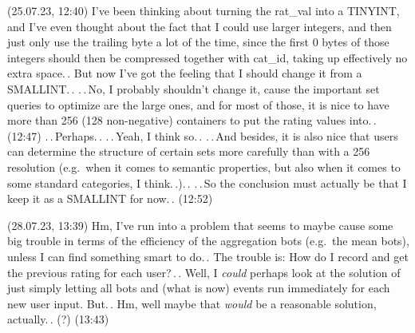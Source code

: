 \documentclass{report}
\begin{document}
(25.07.23, 12:40) I've been thinking about turning the rat\_val into a TINYINT, and I've even thought about the fact that I could use larger integers, and then just only use the trailing byte a lot of the time, since the first 0 bytes of those integers should then be compressed together with cat\_id, taking up effectively no extra space.\,. But now I've got the feeling that I should change it from a SMALLINT.\,. .\,.\,No, I probably shouldn't change it, cause the important set queries to optimize are the large ones, and for most of those, it is nice to have more than 256 (128 non-negative) containers to put the rating values into.\,. (12:47) .\,.\,Perhaps.\,. .\,.\,Yeah, I think so.\,. .\,.\,And besides, it is also nice that users can determine the structure of certain sets more carefully than with a 256 resolution (e.g.\ when it comes to semantic properties, but also when it comes to some standard categories, I think.\,.).\,. .\,.\,So the conclusion must actually be that I keep it as a SMALLINT for now.\,. (12:52)

(28.07.23, 13:39) Hm, I've run into a problem that seems to maybe cause some big trouble in terms of the efficiency of the aggregation bots (e.g.\ the mean bots), unless I can find something smart to do.\,. The trouble is: How do I record and get the previous rating for each user?\,.\,. Well, I \emph{could} perhaps look at the solution of just simply letting all bots and (what is now) events run immediately for each new user input. But.\,. Hm, well maybe that \emph{would} be a reasonable solution, actually.\,. (?) (13:43)
\end{document}
